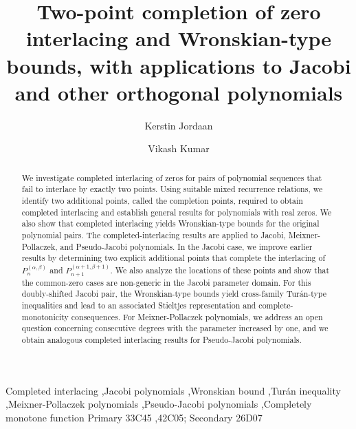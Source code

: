 \documentclass[final,3p,times,12pt]{elsarticle}
\numberwithin{equation}{section}  %
\begin{document}
	\begin{frontmatter}
		\title{Two-point completion of zero interlacing and Wronskian-type bounds, with applications to Jacobi and other orthogonal polynomials}
		
		
		\author[label1]{Kerstin Jordaan}
		\author[label2]{Vikash Kumar}{}
		
		
		\address[label1]{College of Economic and Management Sciences, University of South Africa, Pretoria, 0003, South Africa}
		\address[label2]{Department of Decision Sciences, University of South Africa, Pretoria, 0003, South Africa}
		
		\begin{abstract}
		 We investigate completed interlacing of zeros for pairs of polynomial sequences that fail to interlace by exactly two points. Using suitable mixed recurrence relations, we identify two additional points, called the completion points, required to obtain completed interlacing and establish general results for polynomials with real zeros. We also show that completed interlacing yields Wronskian-type bounds for the original polynomial pairs. The completed-interlacing results are applied to Jacobi, Meixner-Pollaczek, and Pseudo-Jacobi polynomials. In the Jacobi case, we improve earlier results by determining two explicit additional points that complete the interlacing of $P_n^{(\alpha,\beta)}$ and $P_{n+1}^{(\alpha+1,\beta+1)}$. We also analyze the locations of these points and show that the common-zero cases are non-generic in the Jacobi parameter domain. For this doubly-shifted Jacobi pair, the Wronskian-type bounds yield cross-family Turán-type inequalities and lead to an associated Stieltjes representation and complete-monotonicity consequences. For Meixner-Pollaczek polynomials, we address an open question concerning consecutive degrees with the parameter increased by one, and we obtain analogous completed interlacing results for Pseudo-Jacobi polynomials. 
		\end{abstract}
		
		\begin{keyword}
		 Completed interlacing  \sep Jacobi polynomials \sep Wronskian bound \sep Tur\'an inequality  \sep Meixner-Pollaczek polynomials \sep Pseudo-Jacobi polynomials \sep Completely monotone function
			\MSC[2020] Primary 33C45 \sep 42C05; Secondary 26D07
		\end{keyword}
		
		\end{frontmatter}
		
\end{document}
